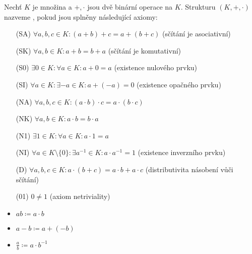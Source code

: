 \begin{definition}
    Nechť $K$ je množina a $+, \cdot$ jsou dvě binární operace na $K$.
    Strukturu $(K, +, \cdot)$ nazveme , pokud jsou splněny
    následující axiomy:
    \begin{enumerate}
        \item[(SA)] $\forall a,b,c \in K: (a+b)+c = a+(b+c)$ (sčítání je
            asociativní)
        \item[(SK)] $\forall a,b \in K: a+b = b+a$ (sčítání je komutativní)
        \item[(S0)] $\exists 0 \in K: \forall a \in K : a + 0 = a$
            (existence nulového prvku)
        \item[(SI)] $\forall a \in K: \exists {-a} \in K: a + (-a) = 0$
            (existence opačného prvku)
        \item[(NA)] $\forall a,b,c \in K: (a \cdot b) \cdot c = a \cdot (b
            \cdot c)$
        \item[(NK)] $\forall a,b \in K: a \cdot b = b \cdot a$
        \item[(N1)] $\exists 1 \in K: \forall a \in K : a \cdot 1 = a$
        \item[(NI)] $\forall a \in K \setminus \{0\}: \exists a^{-1} \in K: a \cdot
            a^{-1} = 1$ (existence inverzního prvku)
        \item[(D)] $\forall a,b,c \in K: a \cdot (b + c) = a \cdot b + a
            \cdot c$ (distributivita násobení vůči sčítání)
        \item[(01)] $0 \neq 1$ (axiom netriviality)
    \end{enumerate}
\end{definition}

\begin{remark}[Značení]
    \leavevmode
    \begin{multicols}{3}
        \begin{itemize}
            \item $ab \coloneqq a \cdot b$
            \item $a - b \coloneqq a + (-b)$
            \item $\frac{a}{b} \coloneqq a \cdot b^{-1}$
        \end{itemize}
    \end{multicols}
\end{remark}

